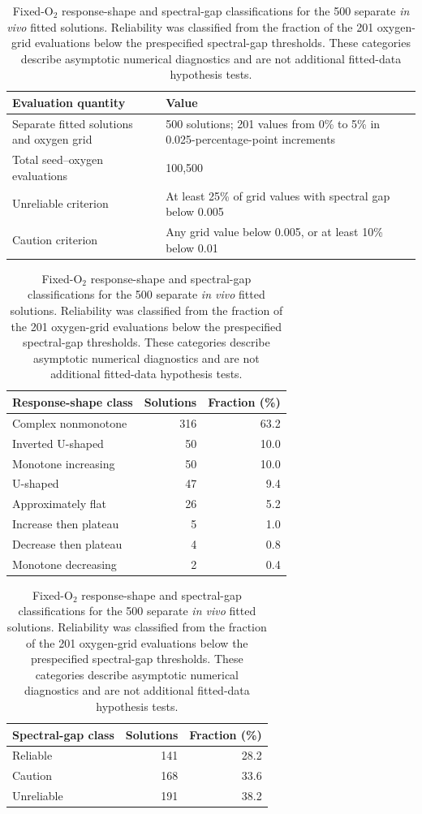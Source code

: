 \begin{table}[!htbp]
\centering
\scriptsize
\setlength{\tabcolsep}{4pt}
\caption{Fixed-O$_2$ response-shape and spectral-gap classifications for the 500 separate \textit{in vivo} fitted solutions. Reliability was classified from the fraction of the 201 oxygen-grid evaluations below the prespecified spectral-gap thresholds. These categories describe asymptotic numerical diagnostics and are not additional fitted-data hypothesis tests.}
\label{tab:fixed_o2_separate_summary}
\begin{tabular}{@{}p{}p{}@{}}
\toprule
Evaluation quantity & Value \\
\midrule
Separate fitted solutions and oxygen grid & 500 solutions; 201 values from 0\% to 5\% in 0.025-percentage-point increments \\
Total seed--oxygen evaluations & 100,500 \\
Unreliable criterion & At least 25\% of grid values with spectral gap below 0.005 \\
Caution criterion & Any grid value below 0.005, or at least 10\% below 0.01 \\
\bottomrule
\end{tabular}

\vspace{0.8em}
\begin{tabular}{@{}lrr@{}}
\toprule
Response-shape class & Solutions & Fraction (\%) \\
\midrule
Complex nonmonotone & 316 & 63.2 \\
Inverted U-shaped & 50 & 10.0 \\
Monotone increasing & 50 & 10.0 \\
U-shaped & 47 & 9.4 \\
Approximately flat & 26 & 5.2 \\
Increase then plateau & 5 & 1.0 \\
Decrease then plateau & 4 & 0.8 \\
Monotone decreasing & 2 & 0.4 \\
\bottomrule
\end{tabular}
\hspace{1.5em}
\begin{tabular}{@{}lrr@{}}
\toprule
Spectral-gap class & Solutions & Fraction (\%) \\
\midrule
Reliable & 141 & 28.2 \\
Caution & 168 & 33.6 \\
Unreliable & 191 & 38.2 \\
\bottomrule
\end{tabular}


\end{table}
